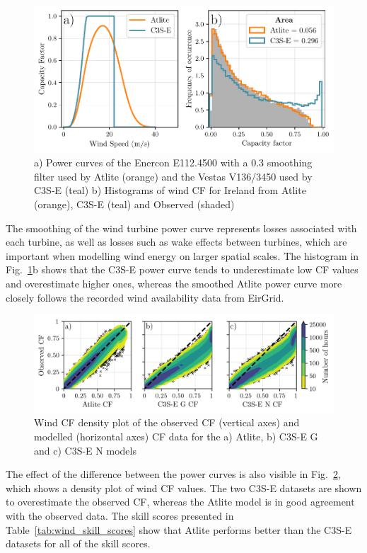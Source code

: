 \documentclass[a4paper, 11p1t]{article}
\begin{document}
\begin{figure}[!ht]
	\centering
	\includegraphics{verification_power_curve.pdf}
	\caption{a) Power curves of the Enercon E112.4500 with a 0.3 smoothing filter used by Atlite (orange) and the Vestas V136/3450 used by C3S-E (teal) b) Histograms of wind CF for Ireland from Atlite (orange), C3S-E (teal) and Observed (shaded)}
	\label{fig:power_curve}
\end{figure}

The smoothing of the wind turbine power curve represents losses associated with each turbine, as well as losses such as wake effects between turbines, which are important when modelling wind energy on larger spatial scales. The histogram in Fig.~\ref{fig:power_curve}b shows that the C3S-E power curve tends to underestimate low CF values and overestimate higher ones, whereas the smoothed Atlite power curve more closely follows the recorded wind availability data from EirGrid.

\begin{figure}[!ht]
	\centering
	\includegraphics{verification_wind_contour.png}
	\caption{Wind CF density plot of the observed CF (vertical axes) and modelled (horizontal axes) CF data for the a) Atlite, b) C3S-E G and c) C3S-E N models}
	\label{fig:wind_verification_contour}
\end{figure}

The effect of the difference between the power curves is also visible in Fig.~\ref{fig:wind_verification_contour}, which shows a density plot of wind CF values. The two C3S-E datasets are shown to overestimate the observed CF, whereas the Atlite model is in good agreement with the observed data. The skill scores presented in Table~\ref{tab:wind_skill_scores} show that Atlite performs better than the C3S-E datasets for all of the skill scores. 
\end{document}

